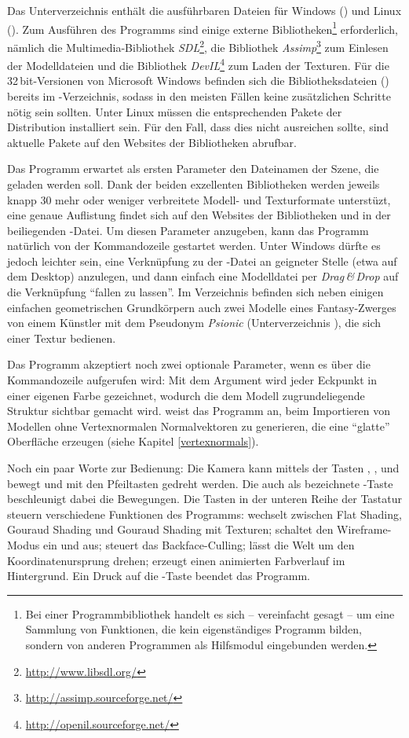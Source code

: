 Das Unterverzeichnis  enthält die ausführbaren Dateien für Windows () und Linux (). Zum Ausführen des Programms sind einige externe Bibliotheken\footnote{Bei einer Programmbibliothek handelt es sich -- vereinfacht gesagt -- um eine Sammlung von Funktionen, die kein eigenständiges Programm bilden, sondern von anderen Programmen als Hilfsmodul eingebunden werden.} erforderlich, nämlich die Multimedia-Bibliothek \emph{SDL}\footnote{\url{http://www.libsdl.org/}}, die Bibliothek \emph{Assimp}\footnote{\url{http://assimp.sourceforge.net/}} zum Einlesen der Modelldateien und die Bibliothek \emph{DevIL}\footnote{\url{http://openil.sourceforge.net/}} zum Laden der Texturen. Für die 32\,bit-Versionen von Microsoft Windows befinden sich die Bibliotheksdateien () bereits im -Verzeichnis, sodass in den meisten Fällen keine zusätzlichen Schritte nötig sein sollten. Unter Linux müssen die entsprechenden Pakete der Distribution installiert sein. Für den Fall, dass dies nicht ausreichen sollte, sind aktuelle Pakete auf den Websites der Bibliotheken abrufbar.

Das Programm erwartet als ersten Parameter den Dateinamen der Szene, die geladen werden soll. Dank der beiden exzellenten Bibliotheken werden jeweils knapp 30 mehr oder weniger verbreitete Modell- und Texturformate unterstüzt, eine genaue Auflistung findet sich auf den Websites der Bibliotheken und in der beiliegenden -Datei. Um diesen Parameter anzugeben, kann das Programm natürlich von der Kommandozeile gestartet werden. Unter Windows dürfte es jedoch leichter sein, eine Verknüpfung zu der -Datei an geigneter Stelle (etwa auf dem Desktop) anzulegen, und dann einfach eine Modelldatei per \emph{Drag\,\&\,Drop} auf die Verknüpfung \enquote{fallen zu lassen}. Im Verzeichnis  befinden sich neben einigen einfachen geometrischen Grundkörpern auch zwei Modelle eines Fantasy-Zwerges von einem Künstler mit dem Pseudonym \emph{Psionic} (Unterverzeichnis ), die sich einer Textur bedienen.

Das Programm akzeptiert noch zwei optionale Parameter, wenn es über die Kommandozeile aufgerufen wird: Mit dem Argument  wird jeder Eckpunkt in einer eigenen Farbe gezeichnet, wodurch die dem Modell zugrundeliegende Struktur sichtbar gemacht wird.  weist das Programm an, beim Importieren von Modellen ohne Vertexnormalen Normalvektoren zu generieren, die eine \enquote{glatte} Oberfläche erzeugen (siehe Kapitel \ref{vertexnormals}).

Noch ein paar Worte zur Bedienung: Die Kamera kann mittels der Tasten , ,  und  bewegt und mit den Pfeiltasten gedreht werden. Die auch als  bezeichnete -Taste beschleunigt dabei die Bewegungen. Die Tasten in der unteren Reihe der Tastatur steuern verschiedene Funktionen des Programms:  wechselt zwischen Flat Shading, Gouraud Shading und Gouraud Shading mit Texturen;  schaltet den Wireframe-Modus ein und aus;  steuert das Backface-Culling;  lässt die Welt um den Koordinatenursprung drehen;  erzeugt einen animierten Farbverlauf im Hintergrund. Ein Druck auf die -Taste beendet das Programm.